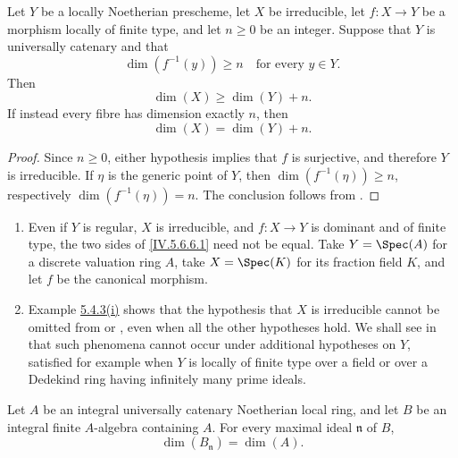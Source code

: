 \begin{corollary}[5.6.8]
\label{IV.5.6.8}
Let $Y$ be a locally Noetherian prescheme, let $X$ be irreducible,
let $f:X\to Y$ be a morphism locally of finite type, and let
$n\geq0$ be an integer.  Suppose that $Y$ is universally catenary
and that
\[
\dim(f^{-1}(y))\geq n
\quad\text{for every }y\in Y.
\]
Then
\begin{equation}
\dim(X)\geq\dim(Y)+n.
\tag{5.6.8.1}\label{IV.5.6.8.1}
\end{equation}
If instead every fibre has dimension exactly $n$, then
\begin{equation}
\dim(X)=\dim(Y)+n.
\tag{5.6.8.2}\label{IV.5.6.8.2}
\end{equation}
\end{corollary}

\begin{proof}
Since $n\geq0$, either hypothesis implies that $f$ is surjective,
and therefore $Y$ is irreducible.  If $\eta$ is the generic point of
$Y$, then $\dim(f^{-1}(\eta))\geq n$, respectively
$\dim(f^{-1}(\eta))=n$.  The conclusion follows from
.
\end{proof}

\begin{remarks}[5.6.9]
\label{IV.5.6.9}
\begin{enumerate}[{\rm(i)}]
\item
{}
\label{IV.5.6.9.i}
Even if $Y$ is regular, $X$ is irreducible, and $f:X\to Y$ is
dominant and of finite type, the two sides of
\eqref{IV.5.6.6.1} need not be equal.  Take
$Y=\Spec(A)$ for a discrete valuation ring $A$, take
$X=\Spec(K)$ for its fraction field $K$, and let $f$ be the
canonical morphism.

\item
{}
\label{IV.5.6.9.ii}
Example \hyperref[IV.5.4.3.i]{5.4.3\textup{(i)}} shows that the
hypothesis that $X$ is
irreducible cannot be omitted from  or
, even when all the other hypotheses hold.  We shall
see in  that such phenomena cannot occur under
additional hypotheses on $Y$, satisfied for example when $Y$ is
locally of finite type over a field or over a Dedekind ring having
infinitely many prime ideals.
\end{enumerate}
\end{remarks}

\begin{proposition}[5.6.10]
\label{IV.5.6.10}
Let $A$ be an integral universally catenary Noetherian local ring,
and let $B$ be an integral finite $A$-algebra containing $A$.  For
every maximal ideal $\mathfrak n$ of $B$,
\[
\dim(B_{\mathfrak n})=\dim(A).
\]
\end{proposition}


